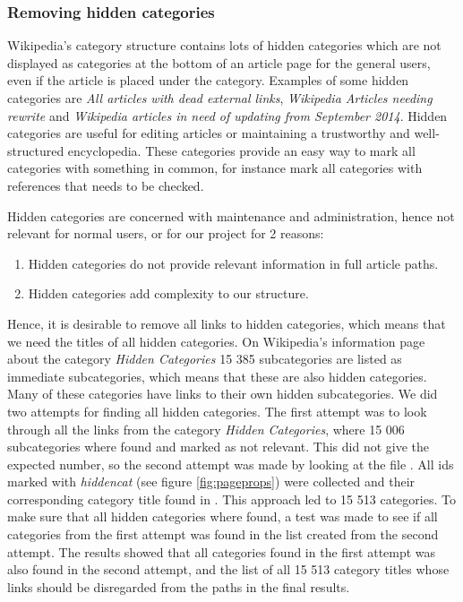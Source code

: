 \subsubsection{Removing hidden categories}
\label{sec:removing_hidden_categories}
Wikipedia's category structure contains lots of hidden categories which are not displayed as categories at the bottom of an article page for the general users, even if the article is placed under the category. Examples of some hidden categories are \emph{All articles with dead external links}, \emph{Wikipedia Articles needing rewrite} and \emph{Wikipedia articles in need of updating from September 2014}. Hidden categories are useful for editing articles or maintaining a trustworthy and well-structured encyclopedia. These categories provide an easy way to mark all  categories with something in common, for instance mark all categories with references that needs to be checked. 

Hidden categories are concerned with maintenance and administration, hence not relevant for normal users, or for our project for 2 reasons: 
\begin{enumerate}
\item Hidden categories do not provide relevant information in full article paths.
\item Hidden categories add complexity to our structure.
\end{enumerate}
Hence, it is desirable to remove all links to hidden categories, which means that we need the titles of all hidden categories.  On Wikipedia's information page about the category \emph{Hidden Categories}\cite{wiki:hiddencat} 15 385 subcategories are listed as immediate subcategories, which means that these are also hidden categories. Many of these categories have links to their own hidden subcategories. We did two attempts for finding all hidden categories. The first attempt was to look through all the links from the category \emph{Hidden Categories}, where 15 006 subcategories where found and marked as not relevant. This did not give the expected number, so the second attempt was made by looking at the file \enwikipageprops. All ids marked with \emph{hiddencat} (see figure \ref{fig:pageprops}) were collected and their corresponding category title found in \enwikipage. This approach led to 15 513 categories. To make sure that all hidden categories where found, a test was made to see if all categories from the first attempt was found in the list created from the second attempt. The results showed that all categories found in the first attempt was also found in the second attempt, and the list of all 15 513 category titles whose links should be disregarded from the paths in the final results. 

